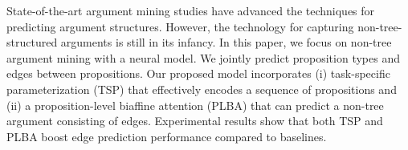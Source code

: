 State-of-the-art argument mining studies have advanced the techniques for predicting argument structures. However, the technology for capturing non-tree-structured arguments is still in its infancy. In this paper, we focus on non-tree argument mining with a neural model. We jointly predict proposition types and edges between propositions. Our proposed model incorporates (i) task-specific parameterization (TSP) that effectively encodes a sequence of propositions and (ii) a proposition-level biaffine attention (PLBA) that can predict a non-tree argument consisting of edges. Experimental results show that both TSP and PLBA boost edge prediction performance compared to baselines.
